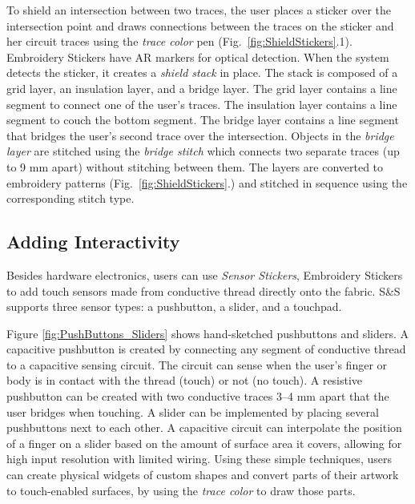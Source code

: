\documentclass[header.tex]{subfiles}
\begin{document}
To shield an intersection between two traces, the user places a sticker over the intersection point and draws connections between the traces on the sticker and her circuit traces using the \textit{trace color} pen (Fig.\ \ref{fig:ShieldStickers}.1). 
Embroidery Stickers have AR markers for optical detection. 
When the system detects the sticker, it creates a \textit{shield stack} in place. The stack is composed of a grid layer, an insulation layer, and a bridge layer. The grid layer contains a line segment to connect one of the user's traces. The insulation layer contains a line segment to couch the bottom segment. The bridge layer contains a line segment that bridges the user's second trace over the intersection. Objects in the \textit{bridge layer} are stitched using the \textit{bridge stitch} which connects two separate traces (up to 9 mm apart) without stitching between them. The layers are converted to embroidery patterns (Fig.\ \ref{fig:ShieldStickers}.) and stitched in sequence using the corresponding stitch type. 



\subsection{Adding Interactivity}
Besides hardware electronics, users can use \textit{Sensor Stickers}, Embroidery Stickers to add touch sensors made from conductive thread directly onto the fabric. S\&S supports three sensor types: a pushbutton, a slider, and a touchpad.

Figure \ref{fig:PushButtons_Sliders} shows hand-sketched pushbuttons and sliders. A capacitive pushbutton is created by connecting any segment of conductive thread to a capacitive sensing circuit. The circuit can sense when the user's finger or body is in contact with the thread (touch) or not (no touch). A resistive pushbutton can be created with two conductive traces 3--4 mm apart that the user bridges when touching. %
A slider can be implemented by placing several pushbuttons next to each other. %
A capacitive circuit can interpolate the position of a finger on a slider based on the amount of surface area it covers, allowing  for high input resolution with limited wiring.  Using these simple techniques, users can create physical widgets of custom shapes and convert parts of their artwork to touch-enabled surfaces, by using the \textit{trace color} to draw those parts.
\end{document}
